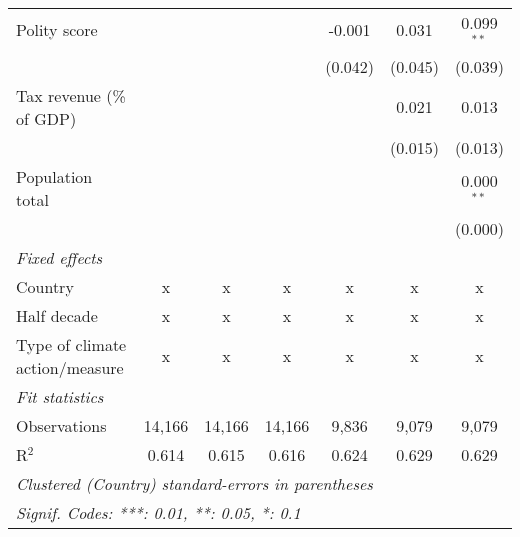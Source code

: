 \begin{tabular}{lcccccc}
   Polity score                                                     &         &                &                & -0.001         & 0.031          & 0.099$^{**}$\\   
                                                                    &         &                &                & (0.042)        & (0.045)        & (0.039)\\   
   Tax revenue (\% of GDP)                                          &         &                &                &                & 0.021          & 0.013\\   
                                                                    &         &                &                &                & (0.015)        & (0.013)\\   
   Population total                                                 &         &                &                &                &                & 0.000$^{**}$\\   
                                                                    &         &                &                &                &                & (0.000)\\   
   \emph{Fixed effects}\\
   Country                                                          & x       & x              & x              & x              & x              & x\\  
   Half decade                                                      & x       & x              & x              & x              & x              & x\\  
   Type of climate action/measure                                   & x       & x              & x              & x              & x              & x\\  
   \midrule \emph{Fit statistics}\\
   Observations                                                     & 14,166  & 14,166         & 14,166         & 9,836          & 9,079          & 9,079\\  
   R$^2$                                                            & 0.614   & 0.615          & 0.616          & 0.624          & 0.629          & 0.629\\  
   \midrule
   \multicolumn{7}{l}{\emph{Clustered (Country) standard-errors in parentheses}}\\
   \multicolumn{7}{l}{\emph{Signif. Codes: ***: 0.01, **: 0.05, *: 0.1}}\\
\end{tabular}
\par\endgroup


